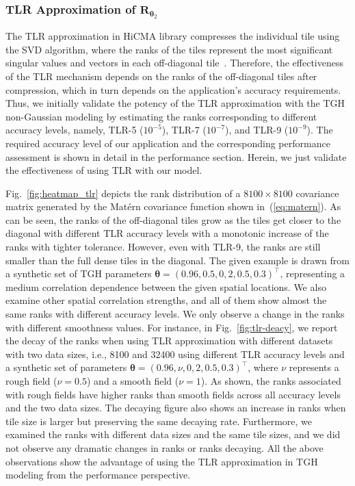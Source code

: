 \documentclass[conference]{IEEEtran}
\begin{document}
\subsubsection*{TLR Approximation of $\bm{R}_{\bm{\theta}_2}$}
The TLR approximation in HiCMA library compresses
the individual tile using
the SVD algorithm, where the ranks of the tiles represent
the most significant singular values and vectors in each off-diagonal tile~\cite{akbudak2017tile}. Therefore, the effectiveness of the TLR
mechanism depends on the ranks of the off-diagonal tiles
after compression, which in turn depends on the application's
accuracy requirements. Thus, we initially validate the potency 
of the TLR approximation with the TGH non-Gaussian modeling
by estimating the ranks corresponding to different accuracy levels, namely, TLR-5 ($10^{-5}$), TLR-7 ($10^{-7}$), and TLR-9 ($10^{-9}$). 
The required accuracy level of our application and the corresponding performance assessment is shown in detail in the performance
section. Herein, we just validate the effectiveness of using TLR
with our model.

Fig.~\ref{fig:heatmap_tlr} depicts the rank distribution
of a $8100 \times 8100$ covariance matrix generated by the
Mat\'ern covariance function shown in~(\ref{eq:matern}).  
As can be seen, the ranks of the off-diagonal tiles grow as the
tiles get closer to the diagonal with different TLR accuracy
levels with a monotonic increase of the ranks with tighter tolerance.
However, even with TLR-9, the ranks are still smaller than the
full dense tiles in the diagonal. The given example is drawn
from a synthetic set of TGH parameters $\bm{\theta} = (0.96, 0.5, 0, 2, 0.5, 0.3)^\top$, representing a medium correlation dependence between
the given spatial locations. We also examine other spatial
correlation strengths, and all of them show almost the same
ranks with different accuracy levels. We only observe a change
in the ranks with different smoothness values. 
For instance, in Fig.~\ref{fig:tlr-deacy}, we  report the 
decay of the ranks when using TLR approximation with 
different datasets with two data sizes, i.e., 8100 and 32400 using
different TLR accuracy levels and
a synthetic set of parameters $\bm{\theta} = (0.96, \nu, 0, 2, 0.5, 0.3)^\top$, 
where $\nu$ represents a rough field ($\nu=0.5$) and a smooth field ($\nu=1$). As shown, the ranks associated with rough fields have higher
ranks than smooth fields across all accuracy levels and the
two data sizes. The decaying figure also shows an increase in 
ranks when tile size is larger but preserving the same decaying
rate. Furthermore, we examined the ranks with different data
sizes and the same tile sizes, and we did not observe
any dramatic changes in ranks or ranks decaying. All the above observations show the advantage of using the TLR approximation
 in TGH modeling from the performance perspective.
\end{document}
